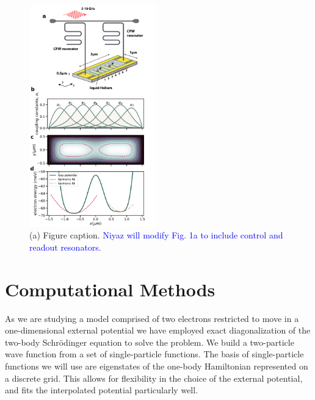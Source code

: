 \documentclass[twocolumn,superscriptaddress,unsortedaddress,
 amsmath,amssymb,
 aps,
]{revtex4-2}
\begin{document}
\begin{figure}
\includegraphics[width=0.49\textwidth]{figure1.pdf}
\caption{\label{fig1} (a) Figure caption. \textcolor{blue}{Niyaz will modify Fig. 1a to include control and readout resonators.}}
\end{figure}

\section{Computational Methods} %
    As we are studying a model comprised of two electrons restricted to move in a
    one-dimensional external potential we have employed exact diagonalization of the
    two-body Schrödinger equation to solve the problem.
    We build a two-particle wave function from a set of single-particle
    functions.
    The basis of single-particle functions we will use are eigenstates of the
    one-body Hamiltonian represented on a discrete grid.
    This allows for flexibility in the choice of the external potential, and fits the
    interpolated potential particularly well.
\end{document}
